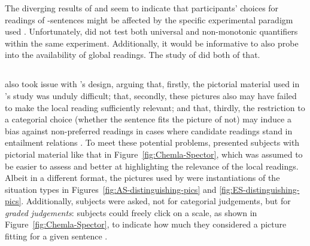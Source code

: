 \documentclass[fleqn,reqno,10pt,draft]{article}
\newcommand{\as}{\acro{as}}
\begin{document}
The diverging results of
\citeauthor{GeurtsPouscoulous2009:Embedded-Implic} and
\citeauthor{CliftonDube2010:Embedded-Implic} seem to indicate that
participants' choices for readings of \as-sentences might be affected
by the specific experimental paradigm used \citep[but see][for
critique of the latter
design]{GeurtsTielvan-Tiel2013:Scalar-expressi}. Unfortunately,
\citet{CliftonDube2010:Embedded-Implic} did not test both universal
and non-monotonic quantifiers within the same
experiment. Additionally, it would be informative to also probe into
the availability of global readings. The study of
\citet{ChemlaSpector2010:Experimental-Ev} did both of that.

\subsection{\citet{ChemlaSpector2010:Experimental-Ev}}
\label{sec:Chemla-Spector}

\citet{ChemlaSpector2010:Experimental-Ev} also took issue with
\citeauthor{GeurtsPouscoulous2009:Embedded-Implic}'s design, arguing
that, firstly, the pictorial material used in
\citeauthor{GeurtsPouscoulous2009:Embedded-Implic}'s study was unduly
difficult; that, secondly, these pictures also may have failed to make
the local reading sufficiently relevant; and that, thirdly, the
restriction to a categorial choice (whether the sentence fits the
picture of not) may induce a bias against non-preferred readings in
cases where candidate readings stand in entailment relations
\citep[see][for this latter
criticism]{Sauerland2010:Embedded-Implic}. To meet these potential
problems, \citet{ChemlaSpector2010:Experimental-Ev} presented subjects
with pictorial material like that in Figure~\ref{fig:Chemla-Spector},
which was assumed to be easier to assess and better at highlighting
the relevance of the local readings. Albeit in a different format, the
pictures used by \citeauthor{ChemlaSpector2010:Experimental-Ev} were
instantiations of the situation types in
Figures~\ref{fig:AS-distinguishing-pics} and
\ref{fig:ES-distinguishing-pics}. Additionally, subjects were asked,
not for categorial judgements, but for \textit{graded judgements}:
subjects could freely click on a scale, as shown in
Figure~\ref{fig:Chemla-Spector}, to indicate how much they considered
a picture fitting for a given sentence \citep[see][for more on this
method]{Chemla2009:Presuppositions}. 
\end{document}
